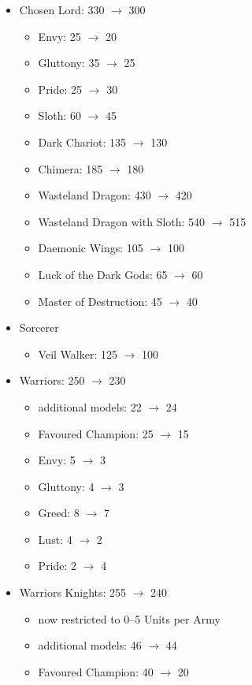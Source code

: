 

\subtitle{0.206.0}

\begin{itemize}
\item Chosen Lord: 330 $\rightarrow$ 300
\begin{itemize}
\item Envy: 25 $\rightarrow$ 20
\item Gluttony: 35 $\rightarrow$ 25
\item Pride: 25 $\rightarrow$ 30
\item Sloth: 60 $\rightarrow$ 45
\item Dark Chariot: 135 $\rightarrow$ 130
\item Chimera: 185 $\rightarrow$ 180
\item Wasteland Dragon: 430 $\rightarrow$ 420
\item Wasteland Dragon with Sloth: 540 $\rightarrow$ 515
\item Daemonic Wings: 105 $\rightarrow$ 100
\item Luck of the Dark Gods: 65 $\rightarrow$ 60
\item Master of Destruction: 45 $\rightarrow$ 40
\end{itemize}
\item Sorcerer
\begin{itemize}
\item Veil Walker: 125 $\rightarrow$ 100
\end{itemize}
\item Warriors: 250 $\rightarrow$ 230
\begin{itemize}
\item additional models: 22 $\rightarrow$ 24
\item Favoured Champion: 25 $\rightarrow$ 15
\item Envy: 5 $\rightarrow$ 3
\item Gluttony: 4 $\rightarrow$ 3
\item Greed: 8 $\rightarrow$ 7
\item Lust: 4 $\rightarrow$ 2
\item Pride: 2 $\rightarrow$ 4
\end{itemize}
\item Warriors Knights: 255 $\rightarrow$ 240
\begin{itemize}
\item now restricted to 0--5 Units per Army
\item additional models: 46 $\rightarrow$ 44
\item Favoured Champion: 40 $\rightarrow$ 20

\end{itemize}
\end{itemize}
